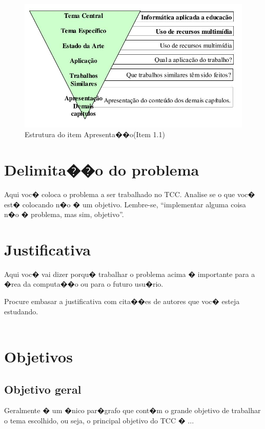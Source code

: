 \documentclass[pnumromarab, normaltoc, a4paper, 12pt]{abnt}
\begin{document}
\begin{figure}[hbtp]
  \begin{center}
  \caption{Estrutura do item Apresenta��o(Item 1.1)}
  \includegraphics[width=150mm]{images/imagem1.jpeg}
  \end{center}
\end{figure}

\section{Delimita��o do problema}
Aqui voc� coloca o problema a ser trabalhado no TCC. Analise se o que voc� est�
colocando n�o � um objetivo. Lembre-se, ``implementar alguma coisa n�o �
problema, mas sim, objetivo''.

\section{Justificativa}
Aqui voc� vai dizer porqu� trabalhar o problema acima � importante para a �rea
da computa��o ou para o futuro usu�rio.

Procure embasar a justificativa com cita��es de autores que voc� esteja
estudando.\\
\\

\section{Objetivos}
\subsection{Objetivo geral}
Geralmente � um �nico par�grafo que cont�m o grande objetivo de trabalhar o tema
escolhido, ou seja, o principal objetivo do TCC � ...
\end{document}
